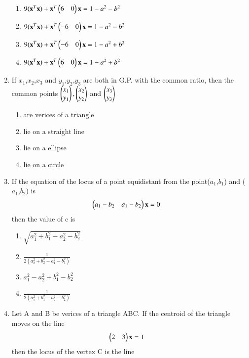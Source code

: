 \begin{enumerate}
    \begin{enumerate}
     \item  $9(\mathbf{x}^T\mathbf {x}) + \mathbf{x}^T \begin{pmatrix}6 & 0\end{pmatrix}\mathbf {x} = 1 - a^2 - b^2$
     \item  $9(\mathbf{x}^T\mathbf {x}) + \mathbf{x}^T \begin{pmatrix}-6 & 0\end{pmatrix}\mathbf {x} = 1 - a^2 - b^2$
     \item  $9(\mathbf{x}^T\mathbf {x}) + \mathbf{x}^T \begin{pmatrix}-6 & 0\end{pmatrix}\mathbf {x} = 1 - a^2 + b^2$
     \item  $9(\mathbf{x}^T\mathbf {x}) + \mathbf{x}^T \begin{pmatrix}6 & 0\end{pmatrix}\mathbf {x} = 1 - a^2 + b^2$
     \end{enumerate}
    \item If $x_1$,$x_2$,$x_3$ and $y_1$,$y_2$,$y_3$ are both in G.P. with the common ratio, then the common points $\begin{pmatrix}x_1\\y_1\end{pmatrix},\begin{pmatrix}x_2\\y_2\end{pmatrix}$ and $\begin{pmatrix}x_3\\y_3\end{pmatrix}$
    \begin{enumerate}
     \item  are verices of a triangle
     \item  lie on a straight line
     \item  lie on a ellipse
     \item  lie on a circle
     \end{enumerate}
    \item If the equation of the locus of a point equidistant from the point($a_1$,$b_1$) and ($a_1$,$b_2$) is \begin{align}\begin{pmatrix}a_1-b_2 & a_1-b_2\end{pmatrix}\mathbf {x} &= 0 \end{align} then the value of c is
    \begin{enumerate}
     \item $\sqrt {a_1^2+b_1^2-a_2^2-b_2^2}$\\
     \item  $\frac{1}{2(a_2^2+b_2^2-a_1^2-b_1^2)}$\\
     \item  $a_1^2-a_2^2+b_1^2-b_2^2$\\
     \item   $\frac{1}{2(a_1^2+b_1^2-a_2^2-b_2^2)}$\\
     \end{enumerate}
    \item Let A and B be verices of a triangle ABC. If the centroid of the triangle moves on the line \begin{align}\begin{pmatrix}2 & 3\end{pmatrix}\mathbf {x} &= 1 \end{align} then the locus of the vertex C is the line

\end{enumerate}
